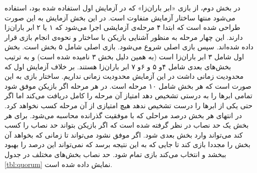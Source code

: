 \documentclass[twoside, a4paper,11pt]{book}
\numberwithin{equation}{chapter}
\numberwithin{table}{chapter}
\numberwithin{figure}{chapter}
\numberwithin{equation}{chapter}
\begin{document}
در بخش دوم، از بازی «ابر باران‌زا» که در آزمایش اول استفاده شده بود، استفاده می‌شود منتها ساختار آزمایش متفاوت است. در این بخش آزمایش به این صورت طراحی شده است که ابتدا ۴ مرحله‌ی آزمایشی اجرا می‌شود که ۱ یا ۲ ابر باران‌زا دارند. این چهار مرحله به منظور آشنایی بازیکن با ساختار و نحوه‌ی انجام بازی قرار داده شده‌اند. سپس بازی اصلی شروع می‌شود. بازی اصلی شامل ۵ بخش است. بخش اول شامل ۳ ابر باران‌زا است (به همین دلیل بخش ۳ نامیده شده است) و به ترتیب بخش‌های بعدی شامل ۴و ۵ و ۶و ۷ ابر باران‌زا هستند. بر خلاف آزمایش اول که محدودیت زمانی داشت در این آزمایش محدودیت زمانی نداریم. ساختار بازی به این صورت است که هر بخش شامل ۱۰ مرحله است. در هر مرحله اگر بازیکن موفق شود تمامی ابرها را به درستی تشخیص دهد امتیاز آن مرحله را کامل دریافت می‌کند اما اگر حتی یکی از ابرها را درست تشخیص ندهد هیچ امتیازی از آن مرحله کسب نخواهد کرد. در انتهای هر بخش درصد مراحلی که با موفقیت گذرانده محاسبه می‌شود. برای هر بخش یک حد نصاب در نظر گرفته شده است که اگر بازیکن بتواند حد نصاب را کسب کند می‌تواند وارد بخش بعدی شود. اگر موفق نشود می‌تواند تا زمانی که بخواهد آن بخش را مجددا بازی کند تا جایی که به این نتیجه برسد که نمی‌تواند این درصد را بهبود ببخشد و انتخاب می‌کند بازی تمام شود. حد نصاب بخش‌های مختلف در جدول \ref{tbl:quorum} نمایش داده شده است. 

\begin{table}[]
\end{table}
\end{document}

